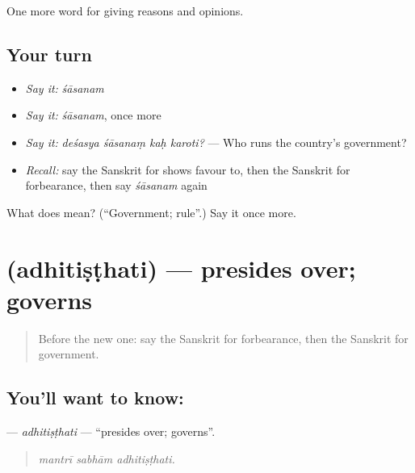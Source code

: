 \begin{grammarlens}[title={What you've built}]
One more word for giving reasons and opinions.
\end{grammarlens}

\subsection*{Your turn}
\begin{itemize}
\raggedright
  \item \emph{Say it:} \emph{śāsanam}
  \item \emph{Say it:} \emph{śāsanam}, once more
  \item \emph{Say it:} \emph{deśasya śāsanaṃ kaḥ karoti?} — Who runs the country's government?
  \item \emph{Recall:} say the Sanskrit for shows favour to, then the Sanskrit for forbearance, then say \emph{śāsanam} again
\end{itemize}

\begin{tcolorbox}[breakable,colback=teal!4,colframe=teal!35!black,title={Before you move on}]
What does  mean? (\textquotedblleft{}Government; rule\textquotedblright{}.) Say it once more.
\end{tcolorbox}
\section[\texorpdfstring{\sk{अधितिष्ठति} (adhitiṣṭhati)}{अधितिष्ठति (adhitiṣṭhati)}]{ (adhitiṣṭhati) — presides over; governs}

\label{lesson:SA-C353-adhitisthati}



\begin{quote}
Before the new one: say the Sanskrit for forbearance, then the Sanskrit for government.
\end{quote}

\subsection*{You'll want to know: }
\textbf{} — \emph{adhitiṣṭhati} — \textquotedblleft{}presides over; governs\textquotedblright{}.

\begin{quote}
  
\end{quote}

\begin{quote}
\emph{mantrī sabhām adhitiṣṭhati.}
\end{quote}

